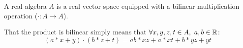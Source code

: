 \begin{definition}[Algebra]\label{d:algebra}
    A real algebra $A$ is a real vector space equipped with a bilinear multiplication operation ($\cdot : A \to A$).

	That the product is bilinear simply means that $\forall x,y,z,t \in A,\ a,b \in \mathbb{R}$:
				\[(a*x + y)\cdot (b*z + t) = ab*xz + a*xt + b*yz + yt\]


\end{definition}
